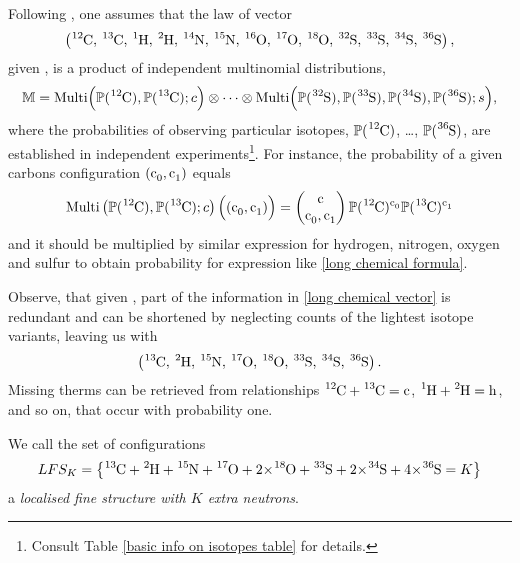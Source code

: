 Following \cite{Kienitz1961MassSpectrometry}, one assumes that the law of vector
\begin{equation}\label{long chemical vector}
	\left( \cem{^{12}C},\, \cem{^{13}C},\, \cem{^{1}H},\, \cem{^{2}H},\, \cem{^{14}N},\, \cem{^{15}N},\, \cem{^{16}O},\, \cem{^{17}O},\, \cem{^{18}O},\, \cem{^{32}S},\, \cem{^{33}S},\, \cem{^{34}S},\, \cem{^{36}S} \right),	
\end{equation}
given \molecule, is a product of independent multinomial distributions,
{\small\begin{equation}\label{product of multinomials}
	\MM = \mathrm{Multi} \Big( \prob(\cem{^{12}C}), \prob(\cem{^{13}C}); c \Big)
	\otimes \dots \otimes 
	\mathrm{Multi} \Big( \prob(\cem{^{32}S}), \prob(\cem{^{33}S}), \prob(\cem{^{34}S}), \prob(\cem{^{36}S}); s \Big),	
\end{equation}}
where the probabilities of observing particular isotopes, $\prob(\cem{^{12}C})$, \dots, $\prob(\cem{^{36}S})$, are established in independent experiments\footnote{Consult Table \ref{basic info on isotopes table} for details.}. For instance, the probability of a given carbons configuration $(\cem{c_0}, \cem{c_1})$ equals
\begin{equation*}
	\mathrm{Multi} \left( \prob(\cem{^{12}C}), \prob(\cem{^{13}C}); c \right)
		\Big( (\cem{c_0}, \cem{c_1}) \Big) = 
	\begin{pmatrix}
		\cem{c} \cr \cem{c_0}, \cem{c_1}  
	\end{pmatrix} \prob(\cem{^{12}C})^\cem{c_0} \prob(\cem{^{13}C})^\cem{c_1}
\end{equation*}
and it should be multiplied by similar expression for hydrogen, nitrogen, oxygen and sulfur to obtain probability for expression like \eqref{long chemical formula}.


Observe, that given \molecule, part of the information in \eqref{long chemical vector} is redundant and can be shortened by neglecting counts of the lightest isotope variants, leaving us with 
\begin{equation}\label{short chemical vector}
 	\left( \cem{^{13}C},\, \cem{^{2}H},\, \cem{^{15}N},\, \cem{^{17}O},\, \cem{^{18}O},\, \cem{^{33}S},\, \cem{^{34}S},\, \cem{^{36}S} \right).	
\end{equation}
Missing therms can be retrieved from relationships $\cem{^{12}C} + \cem{^{13}C} = \cem{c}$, $\cem{^{1}H} + \cem{^{2}H} = \cem{h}$, and so on, that occur with probability one.

\begin{mydef}\label{localised fine structure definition}
	We call the set of configurations  
	{\small
		\begin{equation}\label{LFS_K}
			LFS_K	=
			\left\{ 
				\cem{^{13}C} + \cem{^{2}H} +  \cem{^{15}N} +  \cem{^{17}O} +  \cem{2 $\times$^{18}O} +  \cem{^{33}S} +  \cem{2 $\times$^{34}S} + \cem{4 $\times$^{36}S} = K	
			\right\}
		\end{equation}
	}
	a \emph{localised fine structure with $K$ extra neutrons}.  	
\end{mydef}

